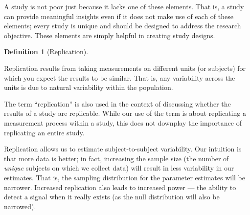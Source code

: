 \documentclass[
  letterpaper,
  DIV=11,
  numbers=noendperiod]{scrreprt}
\theoremstyle{definition}
\theoremstyle{definition}
\newtheorem{definition}{Definition}[chapter]
\theoremstyle{remark}
\begin{document}
\begin{tcolorbox}[enhanced jigsaw, bottomrule=.15mm, titlerule=0mm, bottomtitle=1mm, colback=white, coltitle=black, rightrule=.15mm, leftrule=.75mm, toprule=.15mm, toptitle=1mm, left=2mm, opacityback=0, colframe=quarto-callout-warning-color-frame, breakable, title=\textcolor{quarto-callout-warning-color}{\faExclamationTriangle}\hspace{0.5em}{Warning}, arc=.35mm, colbacktitle=quarto-callout-warning-color!10!white, opacitybacktitle=0.6]

A study is not poor just because it lacks one of these elements. That
is, a study can provide meaningful insights even if it does not make use
of each of these elements; every study is unique and should be designed
to address the research objective. These elements are simply helpful in
creating study designs.

\end{tcolorbox}

\begin{definition}[Replication]\protect\hypertarget{def-replication}{}\label{def-replication}

Replication results from taking measurements on different units (or
subjects) for which you expect the results to be similar. That is, any
variability across the units is due to natural variability within the
population.

\end{definition}

\begin{tcolorbox}[enhanced jigsaw, bottomrule=.15mm, titlerule=0mm, bottomtitle=1mm, colback=white, coltitle=black, rightrule=.15mm, leftrule=.75mm, toprule=.15mm, toptitle=1mm, left=2mm, opacityback=0, colframe=quarto-callout-warning-color-frame, breakable, title=\textcolor{quarto-callout-warning-color}{\faExclamationTriangle}\hspace{0.5em}{Warning}, arc=.35mm, colbacktitle=quarto-callout-warning-color!10!white, opacitybacktitle=0.6]

The term ``replication'' is also used in the context of discussing
whether the results of a study are replicable. While our use of the term
is about replicating a measurement process within a study, this does not
downplay the importance of replicating an entire study.

\end{tcolorbox}

Replication allows us to estimate subject-to-subject variability. Our
intuition is that more data is better; in fact, increasing the sample
size (the number of \emph{unique} subjects on which we collect data)
will result in less variability in our estimates. That is, the sampling
distribution for the parameter estimates will be narrower. Increased
replication also leads to increased power --- the ability to detect a
signal when it really exists (as the null distribution will also be
narrowed).
\end{document}
